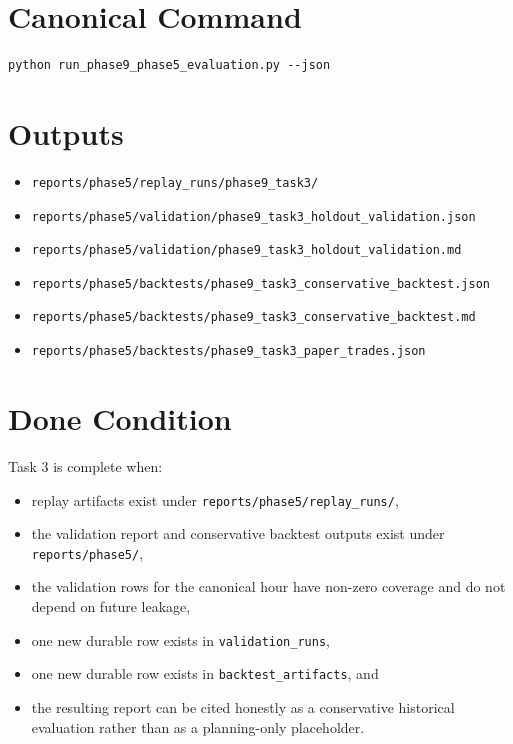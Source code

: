 \documentclass{article}
\begin{document}
\section*{Canonical Command}
\begin{verbatim}
python run_phase9_phase5_evaluation.py --json
\end{verbatim}

\section*{Outputs}
\begin{itemize}
\item \texttt{reports/phase5/replay\_runs/phase9\_task3/}
\item \texttt{reports/phase5/validation/phase9\_task3\_holdout\_validation.json}
\item \texttt{reports/phase5/validation/phase9\_task3\_holdout\_validation.md}
\item \texttt{reports/phase5/backtests/phase9\_task3\_conservative\_backtest.json}
\item \texttt{reports/phase5/backtests/phase9\_task3\_conservative\_backtest.md}
\item \texttt{reports/phase5/backtests/phase9\_task3\_paper\_trades.json}
\end{itemize}

\section*{Done Condition}
Task 3 is complete when:
\begin{itemize}
\item replay artifacts exist under \texttt{reports/phase5/replay\_runs/},
\item the validation report and conservative backtest outputs exist under \texttt{reports/phase5/},
\item the validation rows for the canonical hour have non-zero coverage and do not depend on future leakage,
\item one new durable row exists in \texttt{validation\_runs},
\item one new durable row exists in \texttt{backtest\_artifacts}, and
\item the resulting report can be cited honestly as a conservative historical evaluation rather than as a planning-only placeholder.
\end{itemize}
\end{document}
